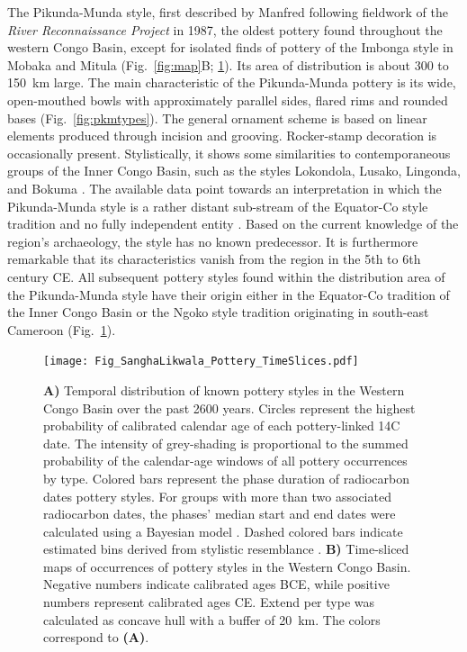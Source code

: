 \documentclass[smallextended,natbib]{svjour3}       %
\begin{document}
The Pikunda-Munda style, first described by Manfred \citet{Eggert.1992,Eggert.1993} following fieldwork of the \textit{River Reconnaissance Project} in 1987, the oldest pottery found throughout the western Congo Basin, except for isolated finds of pottery of the Imbonga style in Mobaka and Mitula (Fig.~\ref{fig:map}B; \ref{fig:timeslicemaps}). Its area of distribution is about 300 to 150~km large. The main characteristic of the Pikunda-Munda pottery is its wide, open-mouthed bowls with approximately parallel sides, flared rims and rounded bases (Fig.~\ref{fig:pkmtypes}). The general ornament scheme is based on linear elements produced through incision and grooving. Rocker-stamp decoration is occasionally present. Stylistically, it shows some similarities to contemporaneous groups of the Inner Congo Basin, such as the styles Lokondola, Lusako, Lingonda, and Bokuma \citep[107]{Wotzka.1995}. The available data point towards an interpretation in which the Pikunda-Munda style is a rather distant sub-stream of the Equator-Co style tradition and no fully independent entity \citep[192]{Seidensticker.2021e}. Based on the current knowledge of the region's archaeology, the style has no known predecessor. It is furthermore remarkable that its characteristics vanish from the region in the 5th to 6th century CE. All subsequent pottery styles found within the distribution area of the Pikunda-Munda style have their origin either in the Equator-Co tradition of the Inner Congo Basin \citep[222-224 Fig.~4,273]{Wotzka.1995} or the Ngoko style tradition originating in south-east Cameroon \citep[189--192]{Seidensticker.2021e} (Fig.~\ref{fig:timeslicemaps}).

\begin{figure}[!tb]
	\centering
	\texttt{[image: Fig\_SanghaLikwala\_Pottery\_TimeSlices.pdf]}
	\caption{\textbf{A)} Temporal distribution of known pottery styles in the Western Congo Basin over the past 2600 years. Circles represent the highest probability of calibrated calendar age of each pottery-linked 14C date. The intensity of grey-shading is proportional to the summed probability of the calendar-age windows of all pottery occurrences by type. Colored bars represent the phase duration of radiocarbon dates pottery styles. For groups with more than two associated radiocarbon dates, the phases' median start and end dates were calculated using a Bayesian model \citep[Fig.~2,Tab.~2]{Crema.2021a,Crema.2021b,Seidensticker.Submitted}. Dashed colored bars indicate estimated bins derived from stylistic resemblance \citep[Data S2]{Seidensticker.2021}. \textbf{B)} Time-sliced maps of occurrences of pottery styles in the Western Congo Basin. Negative numbers indicate calibrated ages BCE, while positive numbers represent calibrated ages CE. Extend per type was calculated as concave hull \citep{Gombin.2017} with a buffer of 20~km. The colors correspond to \textbf{(A)}.}
	\label{fig:timeslicemaps}
\end{figure}
\end{document}
